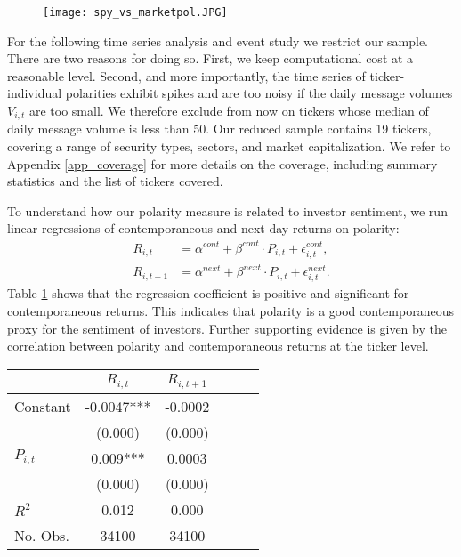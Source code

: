 \begin{figure}[h]
    \centering
    \texttt{[image: spy\_vs\_marketpol.JPG]}
    \label{fig:marketpolspy}
\end{figure}


For the following time series analysis and event study we restrict our sample. There are two reasons for doing so. First, we keep computational cost at a reasonable level. Second, and more importantly, the time series of ticker-individual polarities exhibit spikes and are too noisy if the daily message volumes $V_{i,t}$ are too small. We therefore exclude from now on tickers whose median of daily message volume is less than 50. Our reduced sample contains 19 tickers, covering a range of security types, sectors, and market capitalization. We refer to Appendix \ref{app_coverage} for more details on the coverage, including summary statistics and the list of tickers covered.

To understand how our polarity measure is related to investor sentiment, we run linear regressions of contemporaneous and next-day returns on polarity:
\begin{align}
    R_{i,t} &= \alpha^{cont} + \beta^{cont} \cdot P_{i,t} + \epsilon^{cont}_{i,t}, \\
    R_{i,t+1} &= \alpha^{next} + \beta^{next} \cdot P_{i,t} + \epsilon^{next}_{i,t}.
\end{align}
Table \ref{regpolret} shows that the regression coefficient is positive and significant for contemporaneous returns. This indicates that polarity is a good contemporaneous proxy for the sentiment of investors. Further supporting evidence is given by the correlation between polarity and contemporaneous returns at the ticker level. 

\begin{table}[h]
\centering
\begin{tabular}{l|c|c|c|c|c}
                     & $R_{i,t}$  & $R_{i,t+1}$        \\ \hline   
Constant             & -0.0047***  & -0.0002      \\
                     & (0.000)     & (0.000)      \\
$P_{i,t}$           & 0.009***      & 0.0003       \\
                     & (0.000)       & (0.000)      \\ \hline
$R^2$                & 0.012         & 0.000             \\
No. Obs.             & 34100         & 34100            
\end{tabular}
\label{regpolret}
\end{table}


